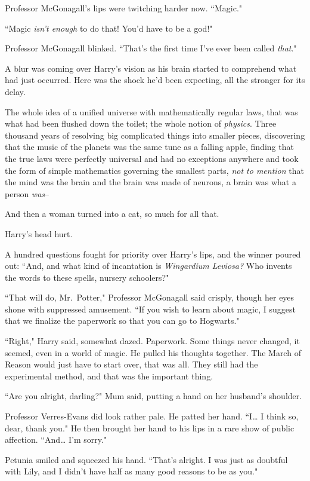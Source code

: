 Professor McGonagall's lips were twitching harder now. ``Magic."

``Magic \emph{isn't enough} to do that! You'd have to be a god!"

Professor McGonagall blinked. ``That's the first time I've ever been called \emph{that}."

A blur was coming over Harry's vision as his brain started to comprehend what had just occurred. Here was the shock he'd been expecting, all the stronger for its delay.

The whole idea of a unified universe with mathematically regular laws, that was what had been flushed down the toilet; the whole notion of \emph{physics}. Three thousand years of resolving big complicated things into smaller pieces, discovering that the music of the planets was the same tune as a falling apple, finding that the true laws were perfectly universal and had no exceptions anywhere and took the form of simple mathematics governing the smallest parts, \emph{not to mention} that the mind was the brain and the brain was made of neurons, a brain was what a person \emph{was}\---

And then a woman turned into a cat, so much for all that.

Harry's head hurt.

A hundred questions fought for priority over Harry's lips, and the winner poured out: ``And, and what kind of incantation is \emph{Wingardium Leviosa?} Who invents the words to these spells, nursery schoolers?"

``That will do, Mr.~Potter," Professor McGonagall said crisply, though her eyes shone with suppressed amusement. ``If you wish to learn about magic, I suggest that we finalize the paperwork so that you can go to Hogwarts."

``Right," Harry said, somewhat dazed. Paperwork. Some things never changed, it seemed, even in a world of magic. He pulled his thoughts together. The March of Reason would just have to start over, that was all. They still had the experimental method, and that was the important thing.

``Are you alright, darling?" Mum said, putting a hand on her husband's shoulder.

Professor Verres-Evans did look rather pale. He patted her hand. ``I{\ldots} I think so, dear, thank you." He then brought her hand to his lips in a rare show of public affection. ``And{\ldots} I'm sorry."

Petunia smiled and squeezed his hand. ``That's alright. I was just as doubtful with Lily, and I didn't have half as many good reasons to be as you."

